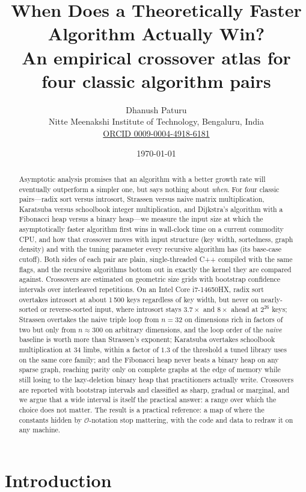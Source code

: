 \documentclass[11pt]{article}
\title{When Does a Theoretically Faster Algorithm Actually Win?\\
\large An empirical crossover atlas for four classic algorithm pairs}
\author{Dhanush Paturu \\ Nitte Meenakshi Institute of Technology, Bengaluru, India \\ \href{https://orcid.org/0009-0004-4918-6181}{ORCID 0009-0004-4918-6181}}
\date{\today}
\newcommand{\bigO}{\mathcal{O}}
\begin{document}
\maketitle

\begin{abstract}
Asymptotic analysis promises that an algorithm with a better growth rate will
eventually outperform a simpler one, but says nothing about \emph{when}. For four
classic pairs---radix sort versus introsort, Strassen versus naive matrix
multiplication, Karatsuba versus schoolbook integer multiplication, and
Dijkstra's algorithm with a Fibonacci heap versus a binary heap---we measure the
input size at which the asymptotically faster algorithm first wins in wall-clock
time on a current commodity CPU, and how that crossover moves with input
structure (key width, sortedness, graph density) and with the tuning parameter
every recursive algorithm has (its base-case cutoff). Both sides of each pair are
plain, single-threaded C++ compiled with the same flags, and the recursive
algorithms bottom out in exactly the kernel they are compared against.
Crossovers are estimated on geometric size grids with bootstrap confidence
intervals over interleaved repetitions. On an Intel Core i7-14650HX, radix sort overtakes introsort at about 1\,500
keys regardless of key width, but never on nearly-sorted or reverse-sorted
input, where introsort stays $3.7\times$ and $8\times$ ahead at $2^{26}$ keys; Strassen
overtakes the naive triple loop from $n=32$ on dimensions rich in factors of
two but only from $n\approx300$ on arbitrary dimensions, and the loop order of
the \emph{naive} baseline is worth more than Strassen's exponent; Karatsuba
overtakes schoolbook multiplication at 34 limbs, within a factor of $1.3$ of
the threshold a tuned library uses on the same core family; and the Fibonacci heap never beats a binary heap on any sparse graph,
reaching parity only on complete graphs at the edge of memory while still
losing to the lazy-deletion binary heap that practitioners actually write.
Crossovers are reported with bootstrap intervals and classified as sharp,
gradual or marginal, and we argue that a wide interval is itself the practical
answer: a range over which the choice does not matter. The result is a practical reference: a map of where the constants
hidden by $\bigO$-notation stop mattering, with the code and data to redraw it
on any machine.
\end{abstract}

\section{Introduction}
\end{document}

